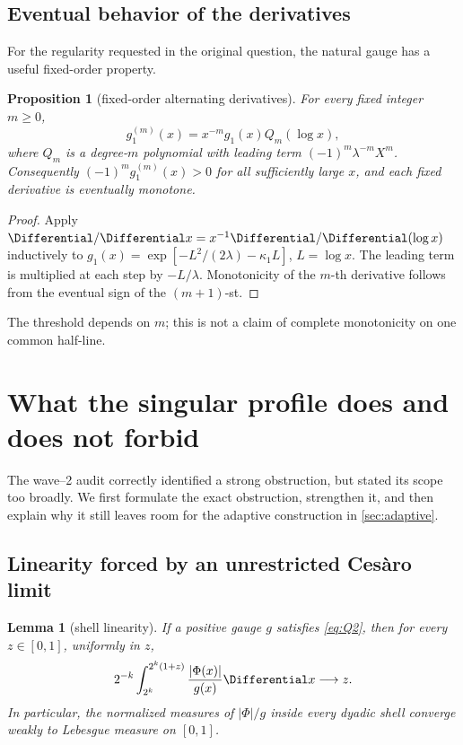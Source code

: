 \documentclass[11pt,oneside]{article}
\newtheorem{proposition}[theorem]{Proposition}
\newtheorem{lemma}[theorem]{Lemma}
\theoremstyle{definition}
\theoremstyle{remark}
\begin{document}
\subsection{Eventual behavior of the derivatives}

For the regularity requested in the original question, the natural gauge has
a useful fixed-order property.

\begin{proposition}[fixed-order alternating derivatives]
\label{prop:derivatives}
For every fixed integer \(m\ge0\),
\begin{equation}
 g_1^{(m)}(x)=x^{-m}g_1(x)Q_m(\log x),
 \label{eq:derivative-polynomial}
\end{equation}
where \(Q_m\) is a degree-\(m\) polynomial with leading term
\((-1)^m\lambda^{-m}X^m\).  Consequently
\((-1)^mg_1^{(m)}(x)>0\) for all sufficiently large \(x\), and each fixed
derivative is eventually monotone.
\end{proposition}

\begin{proof}
Apply \(\Differential/\Differential x=x^{-1}\Differential/\Differential(\log x)\) inductively to
\(g_1(x)=\exp[-L^2/(2\lambda)-\kappa_1L]\), \(L=\log x\).  The leading
term is multiplied at each step by \(-L/\lambda\).  Monotonicity of the
\(m\)-th derivative follows from the eventual sign of the \((m+1)\)-st.
\end{proof}

The threshold depends on \(m\); this is not a claim of complete monotonicity
on one common half-line.

\section{What the singular profile does and does not forbid}
\label{sec:obstructions}

The wave--2 audit correctly identified a strong obstruction, but stated its
scope too broadly.  We first formulate the exact obstruction, strengthen it,
and then explain why it still leaves room for the adaptive construction in
\cref{sec:adaptive}.

\subsection{Linearity forced by an unrestricted Ces\`aro limit}

\begin{lemma}[shell linearity]
\label{lem:shell-linearity}
If a positive gauge \(g\) satisfies \eqref{eq:Q2}, then for every
\(z\in[0,1]\), uniformly in \(z\),
\begin{equation}
 2^{-k}\int_{2^k}^{2^k(1+z)}\frac{|\Phi(x)|}{g(x)}\Differential x
 \longrightarrow z.
 \label{eq:shell-linearity}
\end{equation}
In particular, the normalized measures of \(|\Phi|/g\) inside every dyadic
shell converge weakly to Lebesgue measure on \([0,1]\).
\end{lemma}
\end{document}
